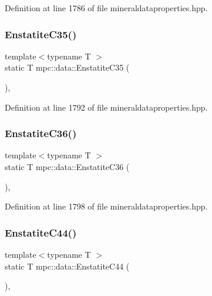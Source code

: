 Definition at line 1786 of file mineraldataproperties.\+hpp.

\mbox{\label{namespacempc_1_1data_a6ed675e5fbbebf4900e1a1af0c9f4c12}} 
\subsubsection{\texorpdfstring{Enstatite\+C35()}{EnstatiteC35()}}
{\footnotesize\ttfamily template$<$typename T $>$ \\
static T mpc\+::data\+::\+Enstatite\+C35 (\begin{DoxyParamCaption}{ }\end{DoxyParamCaption})\hspace{0.3cm}{\ttfamily [inline]}, {\ttfamily [static]}}



Definition at line 1792 of file mineraldataproperties.\+hpp.

\mbox{\label{namespacempc_1_1data_a747e54faa968aab58dc44d77e739d506}} 
\subsubsection{\texorpdfstring{Enstatite\+C36()}{EnstatiteC36()}}
{\footnotesize\ttfamily template$<$typename T $>$ \\
static T mpc\+::data\+::\+Enstatite\+C36 (\begin{DoxyParamCaption}{ }\end{DoxyParamCaption})\hspace{0.3cm}{\ttfamily [inline]}, {\ttfamily [static]}}



Definition at line 1798 of file mineraldataproperties.\+hpp.

\mbox{\label{namespacempc_1_1data_adf6d75242b2a375096608982c9eee7b8}} 
\subsubsection{\texorpdfstring{Enstatite\+C44()}{EnstatiteC44()}}
{\footnotesize\ttfamily template$<$typename T $>$ \\
static T mpc\+::data\+::\+Enstatite\+C44 (\begin{DoxyParamCaption}{ }\end{DoxyParamCaption})\hspace{0.3cm}{\ttfamily [inline]}, {\ttfamily [static]}}



